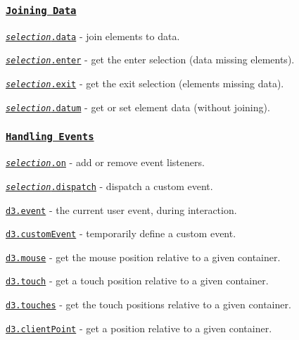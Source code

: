 \subsubsection*{\href{https://github.com/d3/d3-selection/blob/master/README.md#joining-data}{\tt Joining Data}}


\begin{DoxyItemize}
\item \href{https://github.com/d3/d3-selection/blob/master/README.md#selection_data}{\tt {\itshape selection}.data} -\/ join elements to data.
\item \href{https://github.com/d3/d3-selection/blob/master/README.md#selection_enter}{\tt {\itshape selection}.enter} -\/ get the enter selection (data missing elements).
\item \href{https://github.com/d3/d3-selection/blob/master/README.md#selection_exit}{\tt {\itshape selection}.exit} -\/ get the exit selection (elements missing data).
\item \href{https://github.com/d3/d3-selection/blob/master/README.md#selection_datum}{\tt {\itshape selection}.datum} -\/ get or set element data (without joining).
\end{DoxyItemize}

\subsubsection*{\href{https://github.com/d3/d3-selection/blob/master/README.md#handling-events}{\tt Handling Events}}


\begin{DoxyItemize}
\item \href{https://github.com/d3/d3-selection/blob/master/README.md#selection_on}{\tt {\itshape selection}.on} -\/ add or remove event listeners.
\item \href{https://github.com/d3/d3-selection/blob/master/README.md#selection_dispatch}{\tt {\itshape selection}.dispatch} -\/ dispatch a custom event.
\item \href{https://github.com/d3/d3-selection/blob/master/README.md#event}{\tt d3.\+event} -\/ the current user event, during interaction.
\item \href{https://github.com/d3/d3-selection/blob/master/README.md#customEvent}{\tt d3.\+custom\+Event} -\/ temporarily define a custom event.
\item \href{https://github.com/d3/d3-selection/blob/master/README.md#mouse}{\tt d3.\+mouse} -\/ get the mouse position relative to a given container.
\item \href{https://github.com/d3/d3-selection/blob/master/README.md#touch}{\tt d3.\+touch} -\/ get a touch position relative to a given container.
\item \href{https://github.com/d3/d3-selection/blob/master/README.md#touches}{\tt d3.\+touches} -\/ get the touch positions relative to a given container.
\item \href{https://github.com/d3/d3-selection/blob/master/README.md#clientPoint}{\tt d3.\+client\+Point} -\/ get a position relative to a given container.
\end{DoxyItemize}

